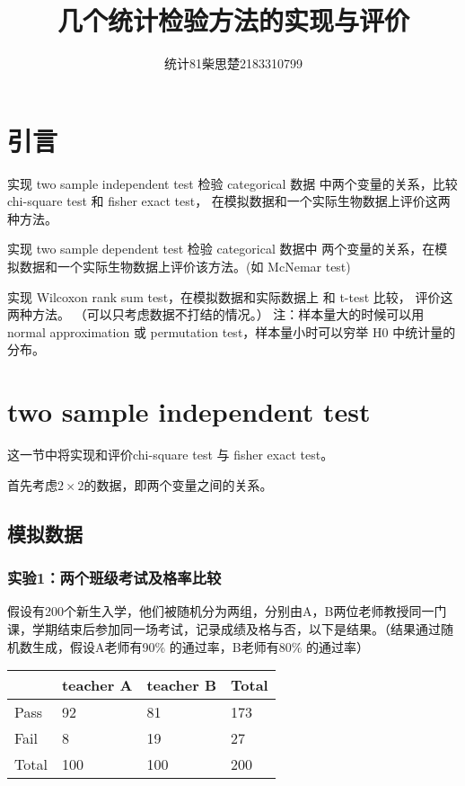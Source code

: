 \documentclass[12pt]{article}
\title{几个统计检验方法的实现与评价}
\author{统计81柴思楚2183310799}
\numberwithin{figure}{section}
\begin{document}
\maketitle

\section{引言}
实现 two sample independent test 检验 categorical 数据
中两个变量的关系，比较 chi-square test 和 fisher exact test，
在模拟数据和一个实际生物数据上评价这两种方法。

实现 two sample dependent test 检验 categorical 数据中
两个变量的关系，在模拟数据和一个实际生物数据上评价该方法。(如
McNemar test)

实现 Wilcoxon rank sum test，在模拟数据和实际数据上
和 t-test 比较， 评价这两种方法。 （可以只考虑数据不打结的情况。）
注：样本量大的时候可以用 normal approximation 或 permutation
test，样本量小时可以穷举 H0 中统计量的分布。


\section{two sample independent test}
这一节中将实现和评价chi-square test 与 fisher exact test。

首先考虑$2\times2$的数据，即两个变量之间的关系。

\subsection{模拟数据}
\subsubsection*{实验1：两个班级考试及格率比较}
假设有200个新生入学，他们被随机分为两组，分别由A，B两位老师教授同一门课，学期结束后参加同一场考试，记录成绩及格与否，以下是结果。（结果通过随机数生成，假设A老师有90\% 的通过率，B老师有80\% 的通过率）
\begin{table}[H]
    \centering
    \begin{tabular}{|l|l|l|l|}
    \hline
          & teacher A & teacher B & Total \\ \hline
    Pass  & 92        & 81        & 173   \\ \hline
    Fail  & 8         & 19        & 27    \\ \hline
    Total & 100       & 100       & 200   \\ \hline
    \end{tabular}
\end{table}
\end{document}
